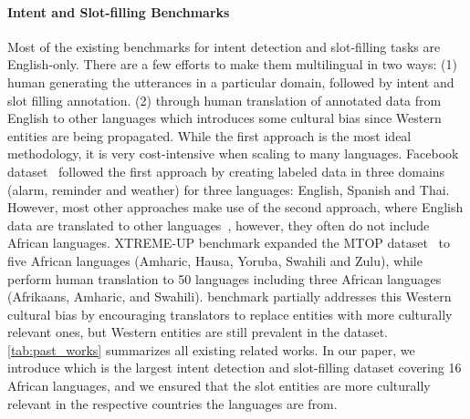 \paragraph{Intent and Slot-filling Benchmarks} Most of the existing benchmarks for intent detection and slot-filling tasks are English-only. There are a few efforts to make them multilingual in two ways: (1) human generating the utterances in a particular domain, followed by intent and slot filling annotation. (2) through human translation of annotated data from English to other languages which introduces some cultural bias since Western entities are being propagated. While the first approach is the most ideal methodology, it is very cost-intensive when scaling to many languages. Facebook dataset~\citep{schuster-etal-2019-cross-lingual} followed the first approach by creating labeled data in three domains (alarm, reminder and weather) for three languages: English, Spanish and Thai. However, most other approaches make use of the second approach, where English data are translated to other languages~\citep{xu-etal-2020-end, van-der-goot-etal-2021-masked,li-etal-2021-mtop}, however, they often do not include African languages. XTREME-UP benchmark expanded the MTOP dataset~\citep{li-etal-2021-mtop} to five African languages (Amharic, Hausa, Yoruba, Swahili and Zulu), while \massive~\citep{fitzgerald-etal-2023-massive} perform human translation to 50 languages including three African languages (Afrikaans, Amharic, and Swahili). \massive benchmark partially addresses this Western cultural bias by encouraging translators to replace entities with more culturally relevant ones, but Western entities are still prevalent in the dataset. \autoref{tab:past_works} summarizes all existing related works. In our paper, we introduce \dataset{} which is the largest intent detection and slot-filling dataset covering 16 African languages, and we ensured that the slot entities are more culturally relevant in the respective countries the languages are from.





